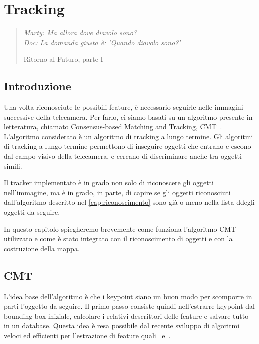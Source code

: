 \chapter{Tracking}
\label{cap:tracking}
\thispagestyle{empty}

\begin{quotation}
{\footnotesize
\noindent\emph{Marty: Ma allora dove diavolo sono? \\
Doc: La domanda giusta è: 'Quando diavolo sono?'}
\begin{flushright}
Ritorno al Futuro, parte I
\end{flushright}
}
\end{quotation}
\vspace{0.5cm}

\section{Introduzione}

Una volta riconosciute le possibili feature, è necessario seguirle nelle immagini successive della telecamera.
Per farlo, ci siamo basati su un algoritmo presente in letteratura, chiamato Consensus-based Matching and Tracking, CMT~\cite{Nebehay2014WACV}.
L'algoritmo considerato è un algoritmo di tracking a lungo termine. Gli algoritmi di tracking a lungo termine permettono di inseguire oggetti che entrano e escono dal campo visivo della telecamera, e cercano di discriminare anche tra oggetti simili.

Il tracker implementato è in grado non solo di riconoscere gli oggetti nell'immagine, ma è in grado, in parte, di capire se gli oggetti riconosciuti dall'algoritmo descritto nel \autoref{cap:riconoscimento} sono già o meno nella lista ddegli oggetti da seguire.

In questo capitolo spiegheremo brevemente come funziona l'algoritmo CMT utilizzato e come è stato integrato con il riconoscimento di oggetti e con la costruzione della mappa.

\section{CMT}

L'idea base dell'algoritmo è che i keypoint siano un buon modo per scomporre in parti l'oggetto da seguire. Il primo passo consiste quindi nell'estrarre keypoint dal bounding box iniziale, calcolare i relativi descrittori delle feature e salvare tutto in un database. Questa idea è resa possibile dal recente sviluppo di algoritmi veloci ed efficienti per l'estrazione di feature quali~\cite{rosten_2006_machine} e~\cite{6126542}.

